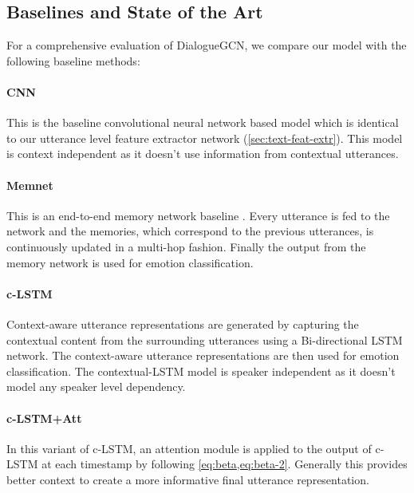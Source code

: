 \documentclass[11pt,a4paper]{article}
\begin{document}
\subsection{Baselines and State of the Art}
\label{sec:baselines}

For a comprehensive evaluation of DialogueGCN, we compare our model with the following baseline methods:

\paragraph{CNN~\cite{kim2014convolutional}}
This is the baseline convolutional neural network based model which is identical to our utterance level feature extractor network (\cref{sec:text-feat-extr}). This model is context independent as it doesn't use information from contextual utterances.


\paragraph{Memnet~\cite{Sukhbaatar:2015:EMN:2969442.2969512}}
This is an end-to-end memory network baseline \cite{hazarika-EtAl:2018:N18-1}. Every utterance is fed to the network and the memories, which correspond to the previous utterances, is continuously updated in a multi-hop fashion. Finally the output from the memory network is used for emotion classification.

\paragraph{c-LSTM~\cite{poria-EtAl:2017:Long}}

Context-aware utterance representations are generated by capturing the contextual content from the surrounding utterances using a Bi-directional LSTM~\cite{hochreiter1997long} network. The context-aware utterance representations are then used for emotion classification. The contextual-LSTM model is speaker independent as it doesn't model any speaker level dependency.

\paragraph{c-LSTM+Att~\cite{poria-EtAl:2017:Long}}

In this variant of c-LSTM, an attention module is applied to the output of c-LSTM at each timestamp by following \cref{eq:beta,eq:beta-2}. Generally this provides better context to create a more informative final utterance representation.
\end{document}
